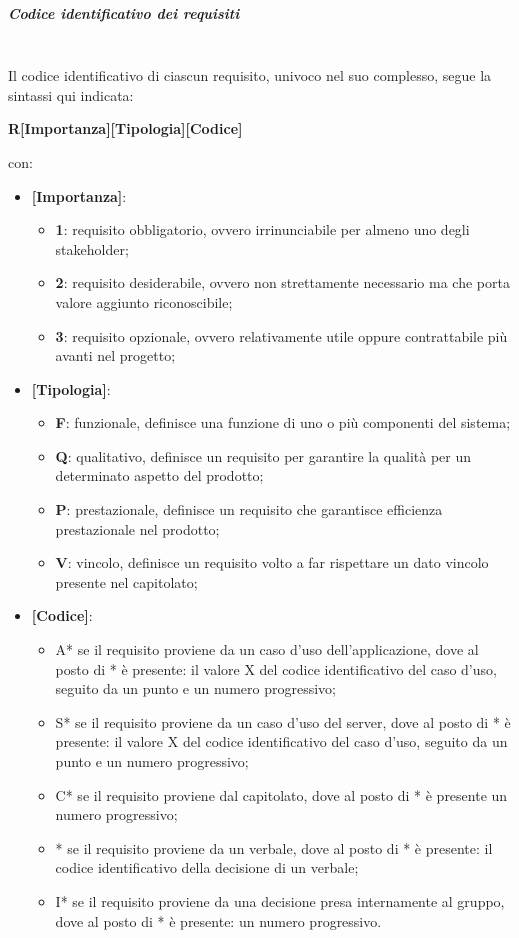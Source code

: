 \subparagraph*{Codice identificativo dei requisiti}\mbox{}\\
Il codice identificativo di ciascun requisito, univoco nel suo complesso, segue la sintassi qui indicata:
\begin{center}
	\textbf{R[Importanza][Tipologia][Codice]}
\end{center}
con:
\begin{itemize}
	\item \textbf{[Importanza]}:
	\begin{itemize}
		\item \textbf{1}: requisito obbligatorio, ovvero irrinunciabile per almeno uno degli stakeholder;
		\item \textbf{2}: requisito desiderabile, ovvero non strettamente necessario ma che porta valore aggiunto riconoscibile;
		\item \textbf{3}: requisito opzionale, ovvero relativamente utile oppure contrattabile più avanti nel progetto;
	\end{itemize}
	\item \textbf{[Tipologia]}:
	\begin{itemize}
		\item \textbf{F}: funzionale, definisce una funzione di uno o più componenti del sistema;
		\item \textbf{Q}: qualitativo, definisce un requisito per garantire la qualità per un determinato aspetto del prodotto;
		\item \textbf{P}: prestazionale, definisce un requisito che garantisce efficienza prestazionale nel prodotto;
		\item \textbf{V}: vincolo, definisce un requisito volto a far rispettare un dato vincolo presente nel capitolato;
	\end{itemize}
	\item \textbf{[Codice]}:
	\begin{itemize}
		\item A* se il requisito proviene da un caso d'uso dell'applicazione, dove al posto di * è presente: il valore X del codice identificativo del caso d'uso, seguito da un punto e un numero progressivo;
		\item S* se il requisito proviene da un caso d'uso del server, dove al posto di * è presente: il valore X del codice identificativo del caso d'uso, seguito da un punto e un numero progressivo;
		\item C* se il requisito proviene dal capitolato, dove al posto di * è presente un numero progressivo;
		\item * se il requisito proviene da un verbale, dove al posto di * è presente: il codice identificativo della decisione di un verbale;
		\item I* se il requisito proviene da una decisione presa internamente al gruppo, dove al posto di * è presente: un numero progressivo.
	\end{itemize}
\end{itemize}

